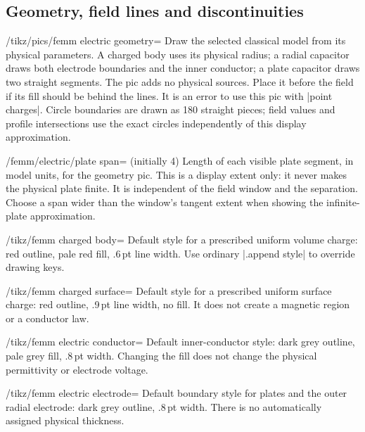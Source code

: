 \subsection{Geometry, field lines and discontinuities}
\label{sec:electric-classic-views}
\begin{key}{/tikz/pics/femm electric geometry=}
Draw the selected classical model from its physical parameters. A charged body
uses its physical radius; a radial capacitor draws both electrode boundaries
and the inner conductor; a plate capacitor draws two straight segments. The
pic adds no physical sources. Place it before the field if its fill should be
behind the lines. It is an error to use this pic with |point charges|.
Circle boundaries are drawn as 180 straight pieces; field values and profile
intersections use the exact circles independently of this display approximation.
\end{key}
\begin{key}{/femm/electric/plate span= (initially 4)}
Length of each visible plate segment, in model units, for the geometry pic.
This is a display extent only: it never makes the physical plate finite.
It is independent of the field window and the separation. Choose a span wider
than the window's tangent extent when showing the infinite-plate approximation.
\end{key}
\begin{key}{/tikz/femm charged body=}
Default style for a prescribed uniform volume charge: red outline, pale red
fill, .6\,pt line width. Use ordinary |.append style| to override drawing keys.
\end{key}
\begin{key}{/tikz/femm charged surface=}
Default style for a prescribed uniform surface charge: red outline, .9\,pt
line width, no fill. It does not create a magnetic region or a conductor law.
\end{key}
\begin{key}{/tikz/femm electric conductor=}
Default inner-conductor style: dark grey outline, pale grey fill, .8\,pt width.
Changing the fill does not change the physical permittivity or electrode voltage.
\end{key}
\begin{key}{/tikz/femm electric electrode=}
Default boundary style for plates and the outer radial electrode: dark grey
outline, .8\,pt width. There is no automatically assigned physical thickness.
\end{key}

